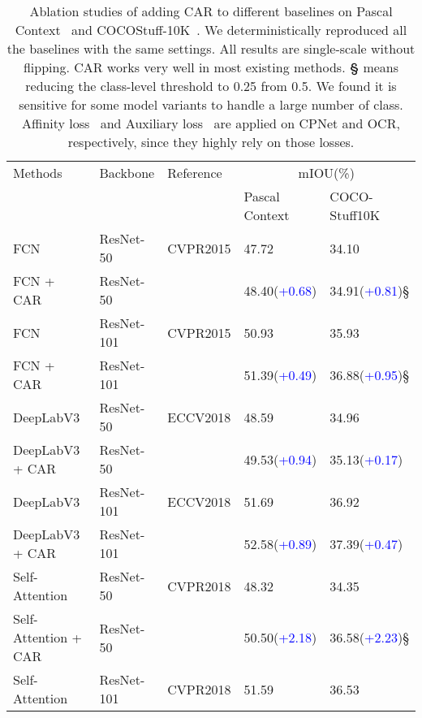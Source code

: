 \begin{table}[h!]
\centering
\scriptsize
\caption{Ablation studies of adding CAR to different baselines on Pascal Context~\cite{cPascalContext} and COCOStuff-10K~\cite{cCocoStuff}. 
We deterministically reproduced all the baselines with the same settings.
All results are single-scale without flipping. 
CAR works very well in most existing methods.
\textbf{\S} means reducing the class-level threshold to 0.25 from 0.5. We found it is sensitive for some model variants to handle a large number of class.
Affinity loss~\cite{cCPN} and Auxiliary loss~\cite{cPSPNet} are applied on CPNet and OCR, respectively, since they highly rely on those losses.
}
\begin{tabular}{l|l|l|l|l}
	\toprule[1pt]
	\rule{0pt}{2ex} Methods & Backbone & Reference \quad\quad & \multicolumn{2}{c}{mIOU(\%)}\\
	\rule{0pt}{2ex}         &     &     & Pascal Context & COCO-Stuff10K  \\
	\midrule[0.5pt]
	\midrule[0.5pt]
    FCN~\cite{cFCN} & ResNet-50~\cite{cResnet}      &  CVPR2015 & 47.72 & 34.10  \\
	FCN + CAR & ResNet-50~\cite{cResnet}            &&48.40(\textcolor{blue}{+0.68}) &34.91(\textcolor{blue}{+0.81})\S  \\
	\midrule[0.1pt]
    FCN~\cite{cFCN} & ResNet-101~\cite{cResnet}     &  CVPR2015 & 50.93 &35.93  \\
	FCN + CAR & ResNet-101~\cite{cResnet}           &&51.39(\textcolor{blue}{+0.49}) &36.88(\textcolor{blue}{+0.95})\S  \\
	\midrule[0.5pt]
	DeepLabV3~\cite{cDeepLabV3Plus} & ResNet-50~\cite{cResnet} & ECCV2018 & 48.59 &34.96  \\
	DeepLabV3 + CAR & ResNet-50~\cite{cResnet}      && 49.53(\textcolor{blue}{+0.94}) &35.13(\textcolor{blue}{+0.17})  \\
	\midrule[0.1pt]
	DeepLabV3~\cite{cDeepLabV3Plus} & ResNet-101~\cite{cResnet} & ECCV2018 & 51.69 &36.92  \\
	DeepLabV3 + CAR & ResNet-101~\cite{cResnet}     & & 52.58(\textcolor{blue}{+0.89}) &37.39(\textcolor{blue}{+0.47})  \\
	\midrule[0.5pt]
	Self-Attention~\cite{cNonLocal} & ResNet-50~\cite{cResnet} & CVPR2018 & 48.32 & 34.35  \\
	Self-Attention + CAR & ResNet-50~\cite{cResnet} & & 50.50(\textcolor{blue}{+2.18}) &36.58(\textcolor{blue}{+2.23})\S  \\
	\midrule[0.1pt]
	Self-Attention~\cite{cNonLocal} & ResNet-101~\cite{cResnet} & CVPR2018 &51.59 & 36.53  \\

\end{tabular}
\end{table}
